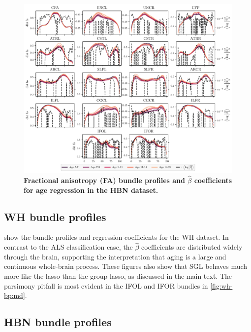 \documentclass[10pt,%
               aps,%
               prl,%
               reprint,%
               superscriptaddress,%
               preprintnumbers,%
               linenumbers,%
               amsmath,%
               floatfix]{revtex4-2}
\begin{document}
\begin{figure}
    \includegraphics[width=\textwidth]{hbn_coefs_profiles_fa.pdf}
    \caption{%
        {%
            \bf Fractional anisotropy (FA) bundle profiles and $\hat{\beta}$
            coefficients for age regression in the HBN dataset.
        }
        \label{fig:hbn-bp:fa}
    }
\end{figure}

\subsection{WH bundle profiles}

 show the bundle profiles and regression
coefficients for the WH dataset. In contrast to the ALS classification case,
the $\hat{\beta}$ coefficients are distributed widely through the brain, supporting
the interpretation that aging is a large and continuous whole-brain process.
These figures also show that SGL behaves much more like the lasso than the group
lasso, as discussed in the main text. The parsimony pitfall is most evident in
the IFOL and IFOR bundles in \cref{fig:wh-bp:md}.

\subsection{HBN bundle profiles}
\end{document}
